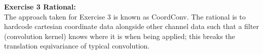 \documentclass[11pt,a4paper]{article}
\begin{document}
\vspace{0.5em}
\noindent\textbf{Exercise 3 Rational:}\vspace{0.5em}\\
\noindent The approach taken for Exercise 3 is known as CoordConv. The rational is to hardcode cartesian coordinate data alongside other channel data such that a filter (convolution kernel) knows where it is when being applied; this breaks the translation equivariance of typical convolution.
\end{document}
